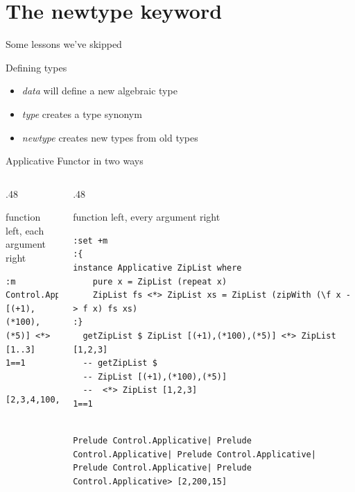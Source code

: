 \documentclass[presetation]{beamer}
\begin{document}
\section{The newtype keyword}
\label{sec:orgd1adea0}
\begin{frame}[label={sec:org68de1ad}]{Some lessons we've skipped}
\begin{block}{Defining types}
\begin{itemize}
\item \emph{data} will define a new algebraic type
\item \emph{type} creates a type synonym
\item \emph{newtype} creates new types from old types
\end{itemize}
\end{block}
\end{frame}

\begin{frame}[fragile,label={sec:orgea5666d}]{Applicative Functor in two ways}
 \begin{columns}
\begin{column}{.48\columnwidth}
\begin{block}{function left, each argument right}
\begin{verbatim}
:m Control.Applicative
[(+1),(*100),(*5)] <*> [1..3]
1==1
\end{verbatim}

\begin{verbatim}

[2,3,4,100,200,300,5,10,15]
\end{verbatim}
\end{block}
\end{column}

\begin{column}{.48\columnwidth}
\begin{block}{function left, every argument right}
\begin{verbatim}
:set +m
:{
instance Applicative ZipList where  
	pure x = ZipList (repeat x)  
	ZipList fs <*> ZipList xs = ZipList (zipWith (\f x -> f x) fs xs)  
:}
  getZipList $ ZipList [(+1),(*100),(*5)] <*> ZipList [1,2,3]
  -- getZipList $
  -- ZipList [(+1),(*100),(*5)]
  --  <*> ZipList [1,2,3]
1==1
\end{verbatim}

\begin{verbatim}

Prelude Control.Applicative| Prelude Control.Applicative| Prelude Control.Applicative| Prelude Control.Applicative| Prelude Control.Applicative> [2,200,15]
\end{verbatim}
\end{block}
\end{column}
\end{columns}
\end{frame}
\end{document}
